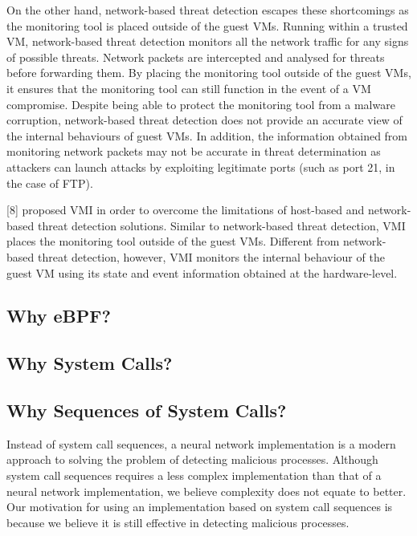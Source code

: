 \documentclass{report}
\begin{document}
\begin{spacing}{1.5}
{On the other hand, network-based threat detection escapes these shortcomings as the monitoring tool is placed outside
of the guest VMs. Running within a trusted VM, network-based threat detection monitors all the network traffic for any signs of possible threats. Network packets are intercepted and analysed for threats before forwarding them. By placing the monitoring tool outside of the guest VMs, it ensures that the monitoring tool can still function in the event of a VM compromise. Despite being able to protect the monitoring tool from a malware corruption, network-based threat detection does not provide an accurate view of the internal behaviours of guest VMs. In addition, the information obtained from monitoring network packets may not be accurate in threat determination as attackers can launch attacks by exploiting legitimate ports (such as port 21, in the case of FTP).


[8] proposed VMI in order to overcome the limitations of
host-based and network-based threat detection solutions.
Similar to network-based threat detection, VMI places the
monitoring tool outside of the guest VMs. Different from
network-based threat detection, however, VMI monitors the
internal behaviour of the guest VM using its state and event
information obtained at the hardware-level.

}


\subsection{Why eBPF?}


\subsection{Why System Calls?}


\subsection{Why Sequences of System Calls?}

Instead of system call sequences, a neural network implementation is a modern
approach to solving the problem of detecting malicious processes. Although system
call sequences requires a less complex implementation than that of a neural network
implementation, we believe complexity does not equate to better. Our motivation for
using an implementation based on system call sequences is because we believe it is
still effective in detecting malicious processes.


















\end{spacing}
\end{document}
